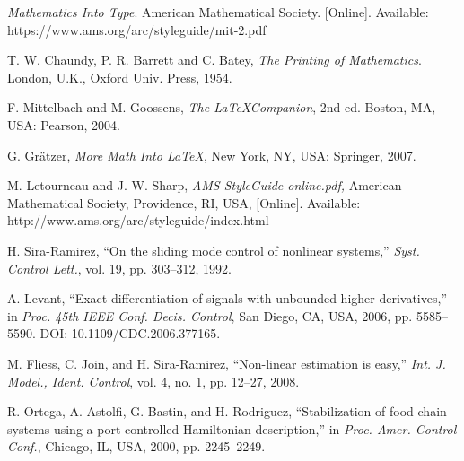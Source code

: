\documentclass[journal]{IEEEtran}
\begin{document}
\begin{thebibliography}{1}
  

  {\it{Mathematics Into Type}}. American Mathematical Society. [Online]. Available: https://www.ams.org/arc/styleguide/mit-2.pdf

  T. W. Chaundy, P. R. Barrett and C. Batey, {\it{The Printing of Mathematics}}. London, U.K., Oxford Univ. Press, 1954.

  F. Mittelbach and M. Goossens, {\it{The \LaTeX Companion}}, 2nd ed. Boston, MA, USA: Pearson, 2004.

  G. Gr\"atzer, {\it{More Math Into LaTeX}}, New York, NY, USA: Springer, 2007.

  M. Letourneau and J. W. Sharp, {\it{AMS-StyleGuide-online.pdf,}} American Mathematical Society, Providence, RI, USA, [Online]. Available: http://www.ams.org/arc/styleguide/index.html

  H. Sira-Ramirez, ``On the sliding mode control of nonlinear systems,'' \textit{Syst. Control Lett.}, vol. 19, pp. 303--312, 1992.

  A. Levant, ``Exact differentiation of signals with unbounded higher derivatives,''  in \textit{Proc. 45th IEEE Conf. Decis.
    Control}, San Diego, CA, USA, 2006, pp. 5585--5590. DOI: 10.1109/CDC.2006.377165.

  M. Fliess, C. Join, and H. Sira-Ramirez, ``Non-linear estimation is easy,'' \textit{Int. J. Model., Ident. Control}, vol. 4, no. 1, pp. 12--27, 2008.

  R. Ortega, A. Astolfi, G. Bastin, and H. Rodriguez, ``Stabilization of food-chain systems using a port-controlled Hamiltonian description,'' in \textit{Proc. Amer. Control Conf.}, Chicago, IL, USA,
  2000, pp. 2245--2249.

\end{thebibliography}
\end{document}
